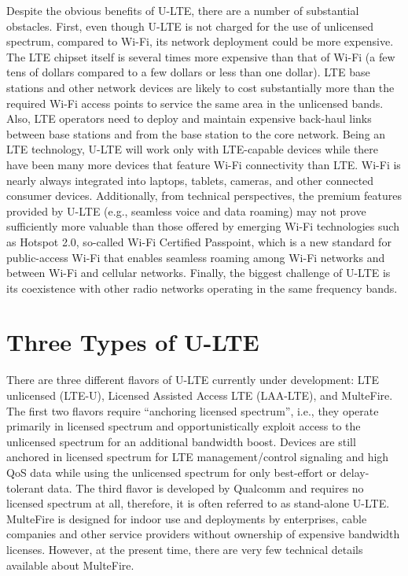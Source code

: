 Despite the obvious benefits of U-LTE, there are a number of substantial obstacles. First, even though U-LTE is not charged for the use of unlicensed spectrum, compared to Wi-Fi, its network deployment could be more expensive. The LTE chipset itself is several times more expensive than that of Wi-Fi (a few tens of dollars compared to a few dollars or less than one dollar). LTE base stations and other network devices are likely to cost substantially more than the required Wi-Fi access points to service the same area in the unlicensed bands.  Also, LTE operators need to deploy and maintain expensive back-haul links between base stations and from the base station to the core network. Being an LTE technology, U-LTE will work only with LTE-capable devices while there have been many more devices that feature Wi-Fi connectivity than LTE. Wi-Fi is nearly always integrated into laptops, tablets, cameras, and other connected consumer devices. Additionally, from technical perspectives, the premium features provided by U-LTE (e.g., seamless voice and data roaming) may not prove sufficiently more valuable than those offered by emerging Wi-Fi technologies such as Hotspot 2.0, so-called Wi-Fi Certified Passpoint, which is a new standard for public-access Wi-Fi that enables seamless roaming among Wi-Fi networks and between Wi-Fi and cellular networks. Finally, the biggest challenge of U-LTE is its coexistence with other radio networks operating in the same frequency bands. 

\section{Three Types of U-LTE}
\label{lte-types}
There are three different flavors of U-LTE currently under development: LTE unlicensed (LTE-U), Licensed Assisted Access LTE (LAA-LTE), and MulteFire. The first two flavors require ``anchoring licensed spectrum'', i.e., they operate primarily in licensed spectrum and opportunistically exploit access to the unlicensed spectrum for an additional bandwidth boost. Devices are still anchored in licensed spectrum for LTE management/control signaling and high QoS data while using the unlicensed spectrum for only best-effort or delay-tolerant data. The third flavor is developed by Qualcomm and requires no licensed spectrum at all, therefore, it is often referred to as stand-alone U-LTE. MulteFire is designed for indoor use and deployments by enterprises, cable companies and other service providers without ownership of expensive bandwidth licenses. However, at the present time, there are very few technical details available about MulteFire.


